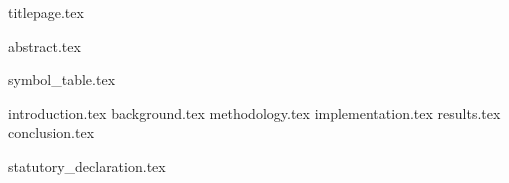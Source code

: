 \documentclass[11pt,fleqn,twoside,ngerman]{article}
\begin{document}
  {titlepage.tex}

  \setcounter{page}{0}

  \cleardoublepage
  {abstract.tex}

  \tableofcontents

  \listoffigures

  {symbol_table.tex}

  \cleardoublepage
  {introduction.tex}
  {background.tex}
  {methodology.tex}
  {implementation.tex}
  {results.tex}
  {conclusion.tex}

  \nocite{*}
  
  

  \cleardoublepage
  \appendix

  \cleardoublepage
  {statutory_declaration.tex}
\end{document}
